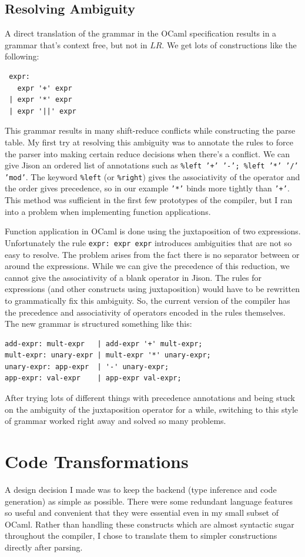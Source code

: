 \documentclass[12pt,a4paper,twoside,openright]{report}
\begin{document}
\subsection{Resolving Ambiguity}
A direct translation of the grammar in the OCaml specification results in a grammar that's context free, but not in $LR$. We get lots of constructions like the following:
\begin{verbatim} expr:
   expr '+' expr
 | expr '*' expr
 | expr '||' expr \end{verbatim}
This grammar results in many shift-reduce conflicts while constructing the parse table.
My first try at resolving this ambiguity was to annotate the rules to force the parser into making certain reduce decisions when there's a conflict.
We can give Jison an ordered list of annotations such as {\tt \%left '+' '-'; \%left '*' '/' 'mod'}.
The keyword {\tt \%left} (or {\tt \%right}) gives the associativity of the operator and the order gives precedence, so in our example {\tt '*'} binds more tightly than {\tt '+'}.
This method was sufficient in the first few prototypes of the compiler, but I ran into a problem when implementing function applications.

Function application in OCaml is done using the juxtaposition of two expressions.
Unfortunately the rule {\tt expr: expr expr} introduces ambiguities that are not so easy to resolve.
The problem arises from the fact there is no separator between or around the expressions.
While we can give the precedence of this reduction, we cannot give the associativity of a blank operator in Jison.
The rules for expressions (and other constructs using juxtaposition) would have to be rewritten to grammatically fix this ambiguity.
So, the current version of the compiler has the precedence and associativity of operators encoded in the rules themselves.
The new grammar is structured something like this:
\begin{verbatim}
add-expr: mult-expr   | add-expr '+' mult-expr;
mult-expr: unary-expr | mult-expr '*' unary-expr;
unary-expr: app-expr  | '-' unary-expr;
app-expr: val-expr    | app-expr val-expr;
\end{verbatim}
After trying lots of different things with precedence annotations and being stuck on the ambiguity of the juxtaposition operator for a while, switching to this style of grammar worked right away and solved so many problems.

\section{Code Transformations}
A design decision I made was to keep the backend (type inference and code generation) as simple as possible.
There were some redundant language features so useful and convenient that they were essential even in my small subset of OCaml.
Rather than handling these constructs which are almost syntactic sugar throughout the compiler, I chose to translate them to simpler constructions directly after parsing.
\end{document}
